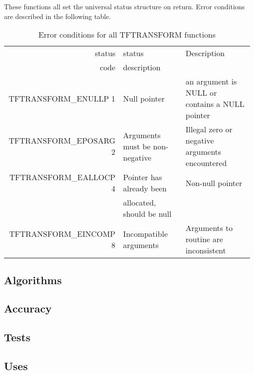 \documentclass{article}
\begin{document}

These functions all set the universal status structure on return.
Error conditions are described in the following table.

\begin{table}
\begin{tabular}{|r|l|p{2in}|}\hline
status  & status          & Description\\
code    & description     & \\\hline
TFTRANSFORM\_ENULLP 1   & Null pointer
  & an argument is NULL or contains a NULL pointer\\
TFTRANSFORM\_EPOSARG 2   & Arguments must be non-negative
  & Illegal zero or negative arguments encountered \\
TFTRANSFORM\_EALLOCP 4  & Pointer has already been
  & Non-null pointer\\ 
 \, & allocated, should be null & \, \\
TFTRANSFORM\_EINCOMP 8   & Incompatible arguments
  & Arguments to routine are inconsistent\\
\hline
\end{tabular}
\caption{Error conditions for all TFTRANSFORM functions}\label{tbl:CV}
\end{table}
                                
\subsection{Algorithms}



\subsection{Accuracy}



\subsection{Tests}


\subsection{Uses}
\end{document}
